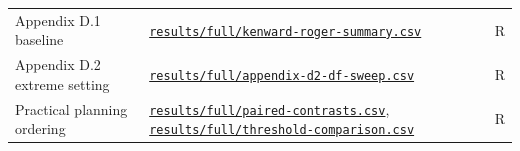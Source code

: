 \begin{longtable}{@{}L{.28\linewidth}L{.60\linewidth}l@{}}
Appendix D.1 baseline & \href{https://github.com/alectionary/vibe-math/blob/master/formalization/kupzyk-power-assumptions/results/full/kenward-roger-summary.csv}{\nolinkurl{results/full/kenward-roger-summary.csv}} & R \\
Appendix D.2 extreme setting & \href{https://github.com/alectionary/vibe-math/blob/master/formalization/kupzyk-power-assumptions/results/full/appendix-d2-df-sweep.csv}{\nolinkurl{results/full/appendix-d2-df-sweep.csv}} & R \\
Practical planning ordering & \href{https://github.com/alectionary/vibe-math/blob/master/formalization/kupzyk-power-assumptions/results/full/paired-contrasts.csv}{\nolinkurl{results/full/paired-contrasts.csv}}, \href{https://github.com/alectionary/vibe-math/blob/master/formalization/kupzyk-power-assumptions/results/full/threshold-comparison.csv}{\nolinkurl{results/full/threshold-comparison.csv}} & R \\
\bottomrule
\end{longtable}
\normalsize

